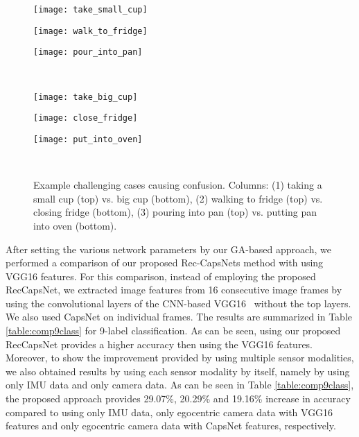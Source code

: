 \documentclass[10pt,twocolumn,letterpaper]{article}
\begin{document}
\begin{figure}[tb!]
\begin{minipage}[b]{.32\columnwidth}
  \centering
  \centerline{\texttt{[image: take\_small\_cup]}}
\smallskip
\end{minipage}
\hfill
\begin{minipage}[b]{.32\columnwidth}
  \centering
  \centerline{\texttt{[image: walk\_to\_fridge]}}
\smallskip
\end{minipage}
\hfill
\begin{minipage}[b]{.32\columnwidth}
  \centering
  \centerline{\texttt{[image: pour\_into\_pan]}}
\smallskip
\end{minipage}\\
\begin{minipage}[b]{.32\columnwidth}
  \centering
  \centerline{\texttt{[image: take\_big\_cup]}}
\smallskip
\end{minipage}
\hfill
\begin{minipage}[b]{.32\columnwidth}
  \centering
  \centerline{\texttt{[image: close\_fridge]}}
\smallskip
\end{minipage}
\hfill
\begin{minipage}[b]{.32\columnwidth}
  \centering
  \centerline{\texttt{[image: put\_into\_oven]}}
\smallskip
\end{minipage}
\hfill \\
\vspace{-0.5cm}
\caption{{\small{Example challenging cases causing confusion. Columns: (1) taking a small cup (top) vs. big cup (bottom), (2) walking to fridge (top) vs. closing fridge (bottom), (3) pouring into pan (top) vs. putting pan into oven (bottom).}}}
\label{fig:diffImages}
\vspace{-0.65cm}
\end{figure}

After setting the various network parameters by our GA-based approach, we performed a comparison of our proposed Rec-CapsNets method with using VGG16 features. For this comparison, instead of employing the proposed RecCapsNet, we extracted image features from 16 consecutive image frames by using the convolutional layers of the CNN-based VGG16~\cite{VGG16} without the top layers. We also used CapsNet on individual frames. The results are summarized in Table \ref{table:comp9class} for 9-label classification. As can be seen, using our proposed RecCapsNet provides a higher accuracy then using the VGG16 features. Moreover, to show the improvement provided by using multiple sensor modalities, we also obtained results by using each sensor modality by itself, namely by using only IMU data and only camera data. As can be seen in Table \ref{table:comp9class}, the proposed approach provides 29.07\%, 20.29\% and 19.16\% increase in accuracy compared to using only IMU data, only egocentric camera data with VGG16 features and only egocentric camera data with CapsNet features, respectively.
\end{document}
